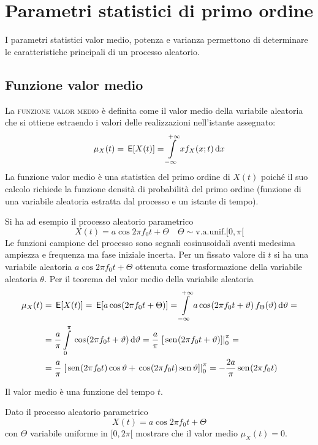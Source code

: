 \section{Parametri statistici di primo ordine}
I parametri statistici valor medio, potenza e varianza permettono di determinare le caratteristiche principali di un processo aleatorio.

\subsection{Funzione valor medio}
La \textsc{funzione valor medio} è definita come il valor medio della variabile aleatoria che si ottiene estraendo i valori delle realizzazioni nell'istante assegnato:
\begin{equation}\label{eq:proc_valor_medio}
\mu_X(t)=\,{\operatorname{\mathsf{E}}}\!\left[{X(t)}\right]=\int\limits_{-\infty}^{+\infty}{x f_X(x;t)}{\,\mathop{}\!\mathrm{d}{x}}
\end{equation}
La funzione valor medio è una statistica del primo ordine di $X(t)$ poiché il suo calcolo richiede la funzione densità di probabilità del primo ordine (funzione di una variabile aleatoria estratta dal processo e un istante di tempo).

\begin{esempio}
Si ha ad esempio il processo aleatorio parametrico
\[X(t)=a\cos{2\pi f_0 t+\Theta}\quad\Theta\sim\text{v.a.unif.} [0,\pi[\]
Le funzioni campione del processo sono segnali cosinusoidali aventi medesima ampiezza e frequenza ma fase iniziale incerta. Per un fissato valore di $t$ si ha una variabile aleatoria $a\cos{2\pi f_0 t+\Theta}$ ottenuta come trasformazione della variabile aleatoria $\theta$.
Per il teorema del valor medio della variabile aleatoria
\begin{equation}\label{eq:esempio_processo_non_stazionario_valor_medio}
\begin{split}\mu_X(t)&=\E{X(t)}=\E{a\cos{2\pi f_0 t+\Theta}}=\intinf{ a\cos{2\pi f_0 t+\theta}f_\Theta(\theta)}{\theta}=\\
&=\frac{a}{\pi}\intd{0}{\pi}{\cos{2\pi f_0 t+\theta}}{\theta}=\frac{a}{\pi}\bound{0}{\pi}{\sen{2\pi f_0 t+\theta}}=\\
&=\frac{a}{\pi}\bound{0}{\pi}{\sen{2\pi f_0 t}\Cos\theta+\cos{2\pi f_0 t}\Sen\theta}=-\frac{2a}{\pi}\sen{2\pi f_0 t}\end{split}\end{equation}

Il valor medio è una funzione del tempo $t$.
\end{esempio}

\begin{esercizio}Dato il processo aleatorio parametrico
\[X(t)=a\cos{2\pi f_0 t+\Theta}\]
con $\Theta$ variabile uniforme in $[0,2\pi[$ mostrare che il valor medio $\mu_X(t)=0$.
\end{esercizio}


